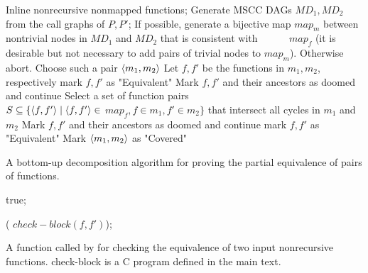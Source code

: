 \begin{algorithm}
\begin{algorithmic}[1]
\State \label{step:inline} Inline nonrecursive nonmapped functions;
\State \label{step:generate} Generate MSCC DAGs $MD_1, MD_2$
          from the call graphs of $P,P'$;
\State If possible,\label{step:possible} generate a bijective map $map_m$ between nontrivial nodes in $MD_1$ and $MD_2$ that is consistent with 
\mbox{~~~~~} $map_f$ (it is desirable but not necessary to add pairs of trivial nodes to $map_m$). Otherwise abort.
 \label{step:while}
  \State \label{step:choose} Choose such a pair $\langle m_1,m_2\rangle$
   \label{step:m1}
    \State Let $f,f'$ be the functions in $m_1,m_2$, respectively
     \label{step:Check}
          {mark $f,f'$ as "Equivalent" }
          \Else \label{step:firstabort}{ Mark $f,f'$ and their ancestors as doomed and continue } 
    \EndIf \label{step:m1endIf}
    \Else
      \State \label{step:select}Select a set of function pairs \newline \mbox{~~~~~~~~~~~~~~~~~} $S \subseteq \{\langle f,f'\rangle\mid \langle f,f'\rangle \in$ $map_f, f \in m_1, f' \in m_2\}$ that intersect all cycles in $m_1$ and $m_2$
      \label{step:forall}
        \label{step:abort}{Mark $f,f'$ and their ancestors as doomed and continue } 
        \EndIf
      \EndFor
       \label{step:forall2}
         mark $f,f'$ as "Equivalent"
      \EndFor
  \EndIf \label{step:selectEnd}
\State \label{step:mark} Mark $\langle m_1,m_2\rangle$ as "Covered"
\EndWhile
\EndFunction
\end{algorithmic}
\caption{A bottom-up decomposition algorithm for proving the partial equivalence of pairs of functions.}
\label{alg:OriginalProve}
\end{algorithm}


\begin{algorithm}
\begin{algorithmic}[1]


 true;

\EndIf

  ( $check-block (f,f')$);

\EndFunction
\end{algorithmic}
\caption{A function called by  for checking the equivalence of two
input nonrecursive functions. check-block is a C program defined in the main text.}
\label{alg:Check}
\end{algorithm}

